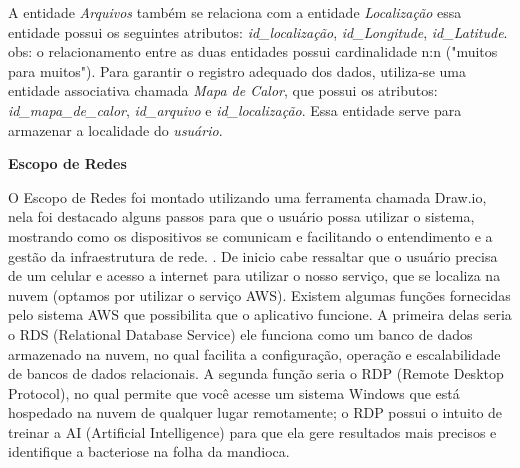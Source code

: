     A entidade \textit{Arquivos} também se relaciona com a entidade \textit{Localização} essa entidade possui os seguintes atributos: \textit{id\_localização}, \textit{id\_Longitude}, \textit{id\_Latitude}. obs: o relacionamento entre as duas entidades possui cardinalidade n:n ("muitos para muitos"). Para garantir o registro adequado dos dados, utiliza-se uma entidade associativa chamada \textit{Mapa de Calor}, que possui os atributos: \textit{id\_mapa\_de\_calor}, \textit{id\_arquivo} e \textit{id\_localização}. Essa entidade serve para armazenar a localidade do \textit{usuário}.

   
    
    \textbf{Escopo de Redes}
   
    O Escopo de Redes foi montado utilizando uma ferramenta chamada Draw.io, nela foi destacado alguns passos para que o usuário possa utilizar o sistema, mostrando como os dispositivos se comunicam e facilitando o entendimento e a gestão da infraestrutura de rede. . De inicio cabe ressaltar que o usuário precisa de um celular e acesso a internet para utilizar o nosso serviço, que se localiza na nuvem (optamos por utilizar o serviço AWS). Existem algumas funções fornecidas pelo sistema AWS que  possibilita que o aplicativo funcione. A primeira delas seria o RDS (Relational Database Service) ele funciona como um banco de dados armazenado na nuvem, no qual facilita a configuração, operação e escalabilidade de bancos de dados relacionais. A segunda função seria o RDP  (Remote Desktop Protocol), no qual permite que você acesse um sistema Windows que está hospedado na nuvem de qualquer lugar remotamente; o RDP possui o intuito de treinar a AI (Artificial Intelligence) para que ela gere resultados mais precisos e identifique a bacteriose na folha da mandioca.
